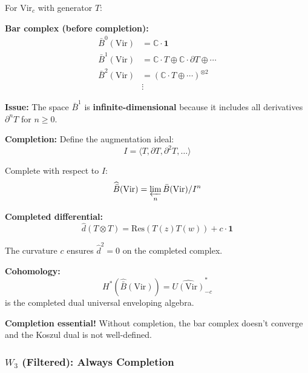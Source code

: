 \begin{example}\label{ex:vir-bar-completion}
For $\text{Vir}_c$ with generator $T$:

\textbf{Bar complex (before completion):}
\begin{align}
\bar{B}^0(\text{Vir}) &= \mathbb{C} \cdot \mathbf{1} \\
\bar{B}^1(\text{Vir}) &= \mathbb{C} \cdot T \oplus \mathbb{C} \cdot \partial T \oplus \cdots \\
\bar{B}^2(\text{Vir}) &= (\mathbb{C} \cdot T \oplus \cdots)^{\otimes 2} \\
&\vdots
\end{align}

\textbf{Issue:} The space $\bar{B}^1$ is \textbf{infinite-dimensional} because it includes 
all derivatives $\partial^n T$ for $n \geq 0$.

\textbf{Completion:} Define the augmentation ideal:
$$I = \langle T, \partial T, \partial^2 T, \ldots \rangle$$

Complete with respect to $I$:
$$\widehat{\bar{B}}(\text{Vir}) = \varprojlim_n \bar{B}(\text{Vir})/I^n$$

\textbf{Completed differential:}
$$\widehat{d}(T \otimes T) = \text{Res}(T(z)T(w)) + c \cdot \mathbf{1}$$

The curvature $c$ ensures $\widehat{d}^2 = 0$ on the completed complex.

\textbf{Cohomology:}
$$H^*(\widehat{\bar{B}}(\text{Vir})) = \widehat{U(\text{Vir})}^*_{-c}$$
is the completed dual universal enveloping algebra.

\textbf{Completion essential!} Without completion, the bar complex doesn't converge and the 
Koszul dual is not well-defined.
\end{example}

\subsubsection{$W_3$ (Filtered): Always Completion}

